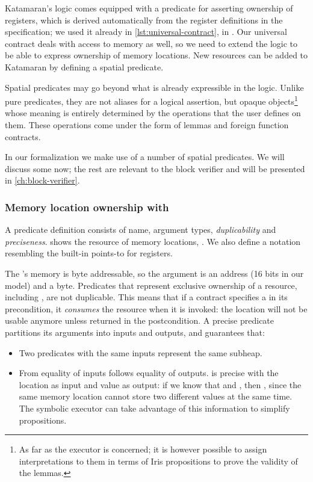 Katamaran's logic comes equipped with a predicate for asserting ownership of registers, which is derived automatically from the register definitions in the \usail specification; we used it already in \cref{lst:universal-contract}, \eg in . Our universal contract deals with access to memory as well, so we need to extend the logic to be able to express ownership of memory locations. New resources can be added to Katamaran by defining a spatial predicate.

Spatial predicates may go beyond what is already expressible in the logic. Unlike pure predicates, they are not aliases for a logical assertion, but opaque objects\footnote{As far as the executor is concerned; it is however possible to assign interpretations to them in terms of Iris propositions to prove the validity of the lemmas.} whose meaning is entirely determined by the operations that the user defines on them. These operations come under the form of lemmas and foreign function contracts.

In our formalization we make use of a number of spatial predicates. We will discuss some now; the rest are relevant to the block verifier and will be presented in \cref{ch:block-verifier}.

\subsubsection{Memory location ownership with }

A predicate definition consists of name, argument types, \emph{duplicability} and \emph{preciseness}.  shows the resource of memory locations, . We also define a notation  resembling the built-in points-to for registers.

The \msp's memory is byte addressable, so the argument  is an address (16 bits in our model) and  a byte. Predicates that represent exclusive ownership of a resource, including , are not duplicable. This means that if a contract specifies a  in its precondition, it \emph{consumes} the resource when it is invoked: the location will not be usable anymore unless returned in the postcondition.
A precise predicate partitions its arguments into inputs and outputs, and guarantees that:
\begin{itemize}
\item Two predicates with the same inputs represent the same subheap.
\item From equality of inputs follows equality of outputs.  is precise with the location as input and value as output: if we know that  and , then , since the same memory location cannot store two different values at the same time. The symbolic executor can take advantage of this information to simplify propositions.
\end{itemize}

